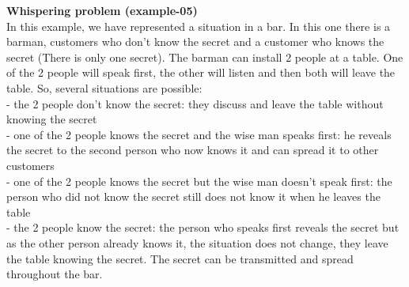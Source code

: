 \documentclass[11pt]{report}
\begin{document}
{}
\tabto{0cm} {\LARGE \textbf{Whispering problem (example-05)}}
\vspace*{3pt}
\vspace*{10pt}
\\
In this example, we have represented a situation in a bar. In this one there is a barman, customers who don't know the secret and a customer who knows the secret (There is only one secret). The barman can install 2 people at a table.  One of the 2 people will speak first, the other will listen and then both will leave the table. So, several situations are possible: \\
- the 2 people don't know the secret: they discuss and leave the table without knowing the secret \\
- one of the 2 people knows the secret and the wise man speaks first: he reveals the secret to the second person who now knows it and can spread it to other customers \\
- one of the 2 people knows the secret but the wise man doesn't speak first: the person who did not know the secret still does not know it when he leaves the table \\
- the 2 people know the secret: the person who speaks first reveals the secret but as the other person already knows it, the situation does not change, they leave the table knowing the secret.
The secret can be transmitted and spread throughout the bar.
\end{document}
